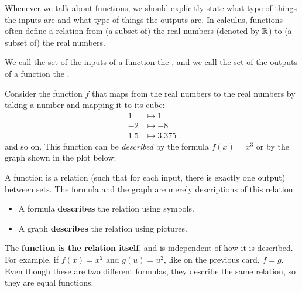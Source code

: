 \documentclass{ximera}
\begin{document}


Whenever we talk about functions, we should explicitly state
what type of things the inputs are and what type of things the outputs
are.  In calculus, functions often define a relation from (a subset
of) the real numbers (denoted by $\mathbb R$) to (a subset of) the real
numbers.

\begin{definition}
  We call the set of the inputs of a function the
  , and we call the set of the outputs of a
  function the .
\end{definition}

\begin{example}
Consider the function $f$ that maps from the real numbers to the real
numbers by taking a number and mapping it to its cube:
\begin{align*}
1 &\mapsto 1\\
-2 &\mapsto -8\\
1.5 &\mapsto 3.375
\end{align*}
and so on. This function can be \textit{described} by the formula
$f(x)=x^3$ or by the graph shown in the plot below:
\begin{image}
\end{image}
\end{example}

\begin{warning}
A function is a relation (such that for each input, there is exactly
one output) between sets. The formula and the graph are merely
descriptions of this relation.
\begin{itemize}
\item A formula \textbf{describes} the relation using symbols.
\item A graph \textbf{describes} the relation using pictures. 
\end{itemize}
The \textbf{function is the relation itself}, and is independent of how
it is described.  \\ For example, if $f(x) = x^2$ and $g(u) = u^2$, like on the previous card, $f = g$.  Even though these are two different formulas, they describe the same relation, so they are equal functions.
\end{warning}
\end{document}
